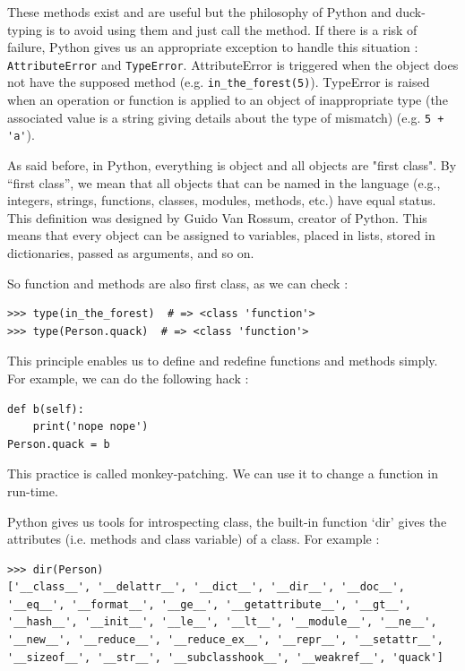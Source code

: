 \documentclass[a4paper,10pt]{article}
\begin{document}
These methods exist and are useful but the philosophy of Python and duck-typing is to avoid using them and just call the method. If there is a risk of failure, Python gives us an appropriate exception to handle this situation : \lstinline|AttributeError| and \lstinline|TypeError|. AttributeError is triggered when the object does not have the supposed method (e.g. \lstinline|in_the_forest(5)|). TypeError is raised when an operation or function is applied to an object of inappropriate type (the associated value is a string giving details about the type of mismatch) (e.g. \lstinline|5 + 'a'|).

As said before, in Python, everything is object and all objects are "first class". By “first class”, we mean that all objects that can be named in the language (e.g., integers, strings, functions, classes, modules, methods, etc.) have equal status. This definition was designed by Guido Van Rossum, creator of Python. This means that every object can be assigned to variables, placed in lists, stored in dictionaries, passed as arguments, and so on.

So function and methods are also first class, as we can check :
\begin{lstlisting}
>>> type(in_the_forest)  # => <class 'function'>
>>> type(Person.quack)  # => <class 'function'>
\end{lstlisting}

This principle enables us to define and redefine functions and methods simply. For example, we can do the following hack :

\begin{lstlisting}
def b(self):
    print('nope nope')
Person.quack = b
\end{lstlisting}


This practice is called monkey-patching. We can use it to change a function in run-time.

Python gives us tools for introspecting class, the built-in function ‘dir’ gives the attributes (i.e. methods and class variable) of a class. For example :
\begin{lstlisting}
>>> dir(Person)
['__class__', '__delattr__', '__dict__', '__dir__', '__doc__', '__eq__', '__format__', '__ge__', '__getattribute__', '__gt__', '__hash__', '__init__', '__le__', '__lt__', '__module__', '__ne__', '__new__', '__reduce__', '__reduce_ex__', '__repr__', '__setattr__', '__sizeof__', '__str__', '__subclasshook__', '__weakref__', 'quack']
\end{lstlisting}
\end{document}
